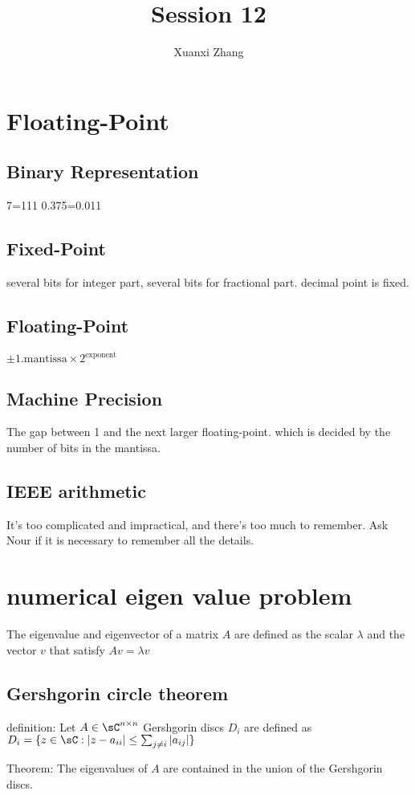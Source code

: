 \documentclass{article}%
\title{\huge Session 12\\
\normalsize}
\author{Xuanxi Zhang}
\begin{document}
\maketitle


\section{Floating-Point}
\subsection{Binary Representation}
7=111
0.375=0.011
\subsection{Fixed-Point}
several bits for integer part, several bits for fractional part. decimal point is fixed.
\subsection{Floating-Point}
$\pm 1.\text{mantissa}\times 2^{\text{exponent}}$
\subsection{Machine Precision}
The gap between 1 and the next larger floating-point. which is decided by the number of bits in the mantissa.
\subsection{IEEE arithmetic}
It’s too complicated and impractical, and there’s too much to remember. Ask Nour if it is necessary to remember all the details.



\section{numerical eigen value problem}
The eigenvalue and eigenvector of a matrix $A$ are defined as the scalar $\lambda$ and the vector $v$ that satisfy $Av=\lambda v$
\subsection{Gershgorin circle theorem}
definition: Let $A\in \sC^{n\times n}$ Gershgorin discs $D_i$ are defined as $D_i=\{z\in \sC: |z-a_{ii}|\le \sum_{j\neq i}|a_{ij}|\}$

Theorem: The eigenvalues of $A$ are contained in the union of the Gershgorin discs.
\end{document}
